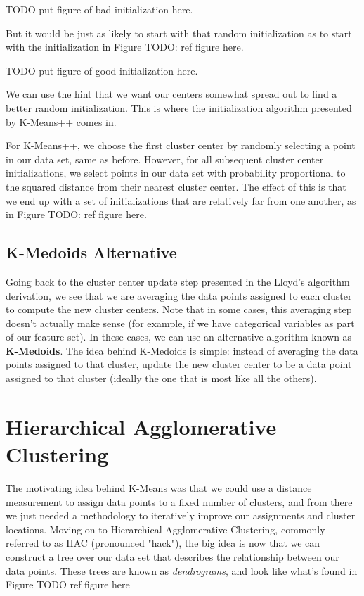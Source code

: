TODO put figure of bad initialization here.

But it would be just as likely to start with that random initialization as to start with the initialization in Figure TODO: ref figure here.

TODO put figure of good initialization here.

We can use the hint that we want our centers somewhat spread out to find a better random initialization. This is where the initialization algorithm presented by K-Means++ comes in.

For K-Means++, we choose the first cluster center by randomly selecting a point in our data set, same as before. However, for all subsequent cluster center initializations, we select points in our data set with probability proportional to the squared distance from their nearest cluster center. The effect of this is that we end up with a set of initializations that are relatively far from one another, as in Figure TODO: ref figure here.

\subsection{K-Medoids Alternative}
Going back to the cluster center update step presented in the Lloyd's algorithm derivation, we see that we are averaging the data points assigned to each cluster to compute the new cluster centers. Note that in some cases, this averaging step doesn't actually make sense (for example, if we have categorical variables as part of our feature set). In these cases, we can use an alternative algorithm known as \textbf{K-Medoids}. The idea behind K-Medoids is simple: instead of averaging the data points assigned to that cluster, update the new cluster center to be a data point assigned to that cluster (ideally the one that is most like all the others).

\section{Hierarchical Agglomerative Clustering}
The motivating idea behind K-Means was that we could use a distance measurement to assign data points to a fixed number of clusters, and from there we just needed a methodology to iteratively improve our assignments and cluster locations. Moving on to Hierarchical Agglomerative Clustering, commonly referred to as HAC (pronounced "hack"), the big idea is now that we can construct a tree over our data set that describes the relationship between our data points. These trees are known as \textit{dendrograms}, and look like what's found in Figure TODO ref figure here

